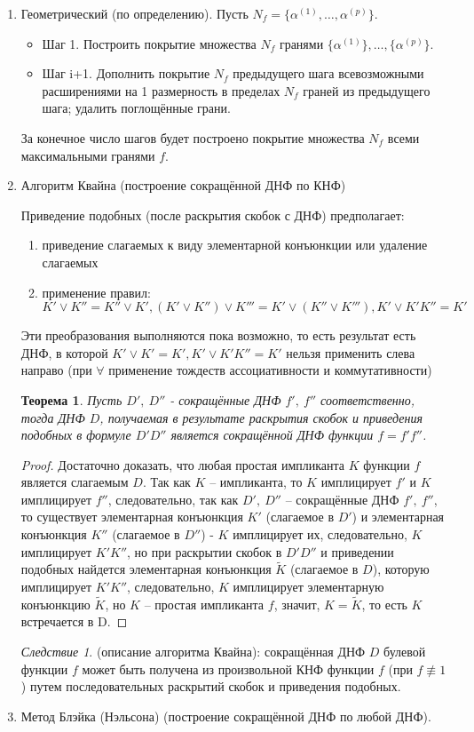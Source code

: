 \documentclass[final]{report}
\newtheorem* {theor} {Теорема}
\theoremstyle {remark}
\theoremstyle {remark}
\newtheorem* {sled} {Следствие}
\begin{document}
\begin{enumerate}
\item Геометрический (по определению).
Пусть $N_f=\{\alpha^{(1)},\ldots,\alpha^{(p)}\}$.
\begin{itemize}
\item Шаг 1. Построить покрытие множества $N_f$ гранями $\{\alpha^{(1)}\},\ldots,\{\alpha^{(p)}\}.$
\item Шаг i+1. Дополнить покрытие $N_f$ предыдущего шага всевозможными расширениями на 1 размерность в пределах $N_f$ граней из предыдущего шага; удалить поглощённые грани.
\end{itemize}
За конечное число шагов будет построено покрытие множества $N_f$ всеми максимальными гранями $f$. 
\item Алгоритм Квайна (построение сокращённой ДНФ по КНФ)

Приведение подобных (после раскрытия скобок с ДНФ) предполагает:
\begin{enumerate}
\item приведение слагаемых к виду элементарной конъюнкции или удаление слагаемых
\item применение правил: $K' \lor K'' = K'' \lor K', (K' \lor K'')\lor K'''=K'\lor(K'' \lor K'''), K' \lor K'K''=K'$
\end{enumerate}
Эти преобразования выполняются пока возможно, то есть результат есть ДНФ, в которой $K' \lor K'=K', K' \lor K'K''=K'$ нельзя применить слева направо (при $\forall$ применение тождеств ассоциативности и коммутативности) 
\begin{theor} 
Пусть $D',\ D''$ - сокращённые ДНФ $f',\ f''$ соответственно, тогда ДНФ $D$, получаемая в результате раскрытия скобок и приведения подобных в формуле $D'D''$ является сокращённой ДНФ функции $f=f'f''$.
\end{theor}
\begin{proof}
Достаточно доказать, что любая простая импликанта $K$ функции $f$ является слагаемым $D$.
Так как $K$ -- импликанта, то $K$ имплицирует $f'$ и $K$ имплицирует $f''$, следовательно, так как $D',\ D''$ -- сокращённые ДНФ $f',\ f''$, то существует элементарная конъюнкция $K'$ (слагаемое в $D'$) и элементарная конъюнкция $K''$ (слагаемое в $D''$) - $K$ имплицирует их, следовательно, $K$ имплицирует $K'K''$, но при раскрытии скобок в $D'D''$ и приведении подобных найдется элементарная конъюнкция $\tilde{K}$ (слагаемое в $D$), которую имплицирует $K'K''$, следовательно, $K$ имплицирует элементарную конъюнкцию $\tilde{K}$, но $K$ -- простая импликанта $f$, значит, $K=\tilde{K}$, то есть $K$ встречается в D.
\end{proof} 
\begin{sled}
(описание алгоритма Квайна): сокращённая ДНФ $D$ булевой функции $f$ может быть получена из произвольной КНФ функции $f$ (при $f \not\equiv 1$) путем последовательных раскрытий скобок и приведения подобных.
\end{sled}
\item Метод Блэйка (Нэльсона) (построение сокращённой ДНФ по любой ДНФ).


\end{enumerate}
\end{document}

